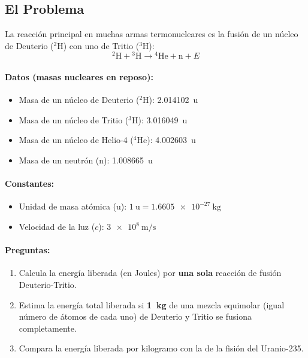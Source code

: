 \documentclass[11pt,a4paper]{article}
\begin{document}
\begin{enumerate}
\subsection*{El Problema}
La reacción principal en muchas armas termonucleares es la fusión de un núcleo de Deuterio (${}^2\text{H}$) con uno de Tritio (${}^3\text{H}$):
\[ {}^2\text{H} + {}^3\text{H} \rightarrow {}^4\text{He} + \text{n} + E \]

\paragraph{Datos (masas nucleares en reposo):}
\begin{itemize}
    \item Masa de un núcleo de Deuterio (${}^2\text{H}$): \SI{2.014102}{\atomicmassunit}
    \item Masa de un núcleo de Tritio (${}^3\text{H}$): \SI{3.016049}{\atomicmassunit}
    \item Masa de un núcleo de Helio-4 (${}^4\text{He}$): \SI{4.002603}{\atomicmassunit}
    \item Masa de un neutrón (n): \SI{1.008665}{\atomicmassunit}
\end{itemize}

\paragraph{Constantes:}
\begin{itemize}
    \item Unidad de masa atómica (u): $\SI{1}{\atomicmassunit} = \SI{1.6605e-27}{\kilo\gram}$
    \item Velocidad de la luz ($c$): $\SI{3e8}{\meter\per\second}$
\end{itemize}

\paragraph{Preguntas:}
\begin{enumerate}
    \item Calcula la energía liberada (en Joules) por \textbf{una sola} reacción de fusión Deuterio-Tritio.
    \item Estima la energía total liberada si \textbf{\SI{1}{\kilo\gram}} de una mezcla equimolar (igual número de átomos de cada uno) de Deuterio y Tritio se fusiona completamente.
    \item Compara la energía liberada por kilogramo con la de la fisión del Uranio-235.
\end{enumerate}


\end{enumerate}
\end{document}
